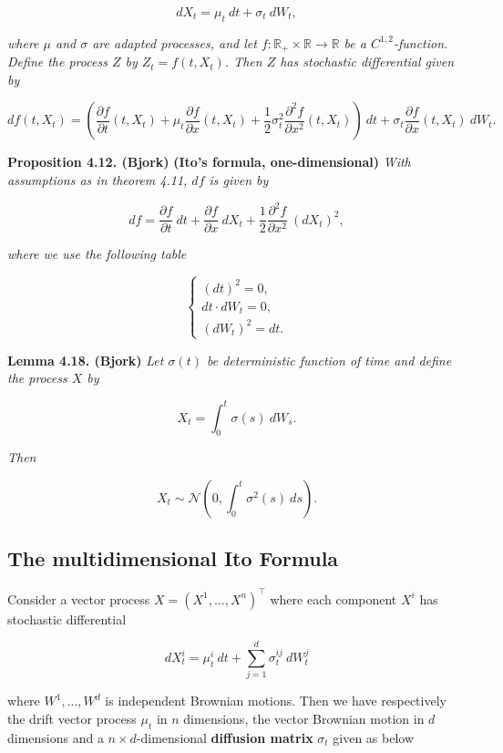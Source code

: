 \documentclass[a4paper,12pt,openany]{book}
\begin{document}
\[
dX_t=\mu_t\ dt + \sigma_t\ dW_t,\tag{4.28}
\]

\emph{where \(\mu\) and \(\sigma\) are adapted processes, and let \(f:\mathbb{R}_+\times\mathbb{R}\to\mathbb{R}\) be a \(C^{1,2}\)-function. Define the process \(Z\) by \(Z_t=f(t,X_t)\). Then \(Z\) has stochastic differential given by}

\[
df(t,X_t)=\left(\frac{\partial f}{\partial t}(t,X_t) + \mu_t\frac{\partial f}{\partial x}(t,X_t) + \frac{1}{2}\sigma^2_t\frac{\partial^2 f}{\partial x^2}(t,X_t)\right)\ dt+\sigma_t\frac{\partial f}{\partial x}(t,X_t)\ dW_t.\tag{4.29}
\]

\textbf{Proposition 4.12. (Bjork)} \textbf{(Ito's formula, one-dimensional)} \emph{With assumptions as in theorem 4.11, \(df\) is given by}

\[
df=\frac{\partial f}{\partial t}\ dt + \frac{\partial f}{\partial x}\ dX_t + \frac{1}{2}\frac{\partial^2 f}{\partial x^2}\ (dX_t)^2,\tag{4.31}
\]

\emph{where we use the following table}

\[
\left\{\begin{matrix}(dt)^2=0,\\ dt\cdot dW_t=0,\\ (dW_t)^2=dt.\end{matrix}\right.
\]

\textbf{Lemma 4.18. (Bjork)} \emph{Let \(\sigma(t)\) be deterministic function of time and define the process \(X\) by}

\[
X_t=\int_0^t \sigma(s)\ dW_s.\tag{4.37}
\]

\emph{Then}

\[
X_t\sim\mathcal{N}\left(0,\int_0^t\sigma^2(s)\ ds\right).
\]

\hypertarget{the-multidimensional-ito-formula}{%
\subsection{The multidimensional Ito Formula}\label{the-multidimensional-ito-formula}}

Consider a vector process \(X=(X^1,...,X^n)^\top\) where each component \(X^i\) has stochastic differential

\[
d X_t^i=\mu_t^i\ dt+\sum_{j=1}^d\sigma^{ij}_t\ dW_t^j
\]

where \(W^1,...,W^d\) is independent Brownian motions. Then we have respectively the drift vector process \(\mu_t\) in \(n\) dimensions, the vector Brownian motion in \(d\) dimensions and a \(n\times d\)-dimensional \textbf{diffusion matrix} \(\sigma_t\) given as below
\end{document}

